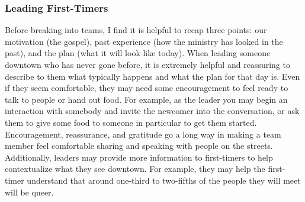 \subsubsection{Leading First-Timers}

    Before breaking into teams, I find it is helpful to recap three points: our motivation (the gospel), past experience (how the ministry has looked in the past), and the plan (what it will look like today).
    When leading someone downtown who has never gone before, it is extremely helpful and reassuring to describe to them what typically happens and what the plan for that day is.
    Even if they seem comfortable, they may need some encouragement to feel ready to talk to people or hand out food.
    For example, as the leader you may begin an interaction with somebody and invite the newcomer into the conversation, or ask them to give some food to someone in particular to get them started.
    Encouragement, reassurance, and gratitude go a long way in making a team member feel comfortable sharing and speaking with people on the streets.
    Additionally, leaders may provide more information to first-timers to help contextualize what they see downtown.
    For example, they may help the first-timer understand that around one-third to two-fifths of the people they will meet will be queer.

